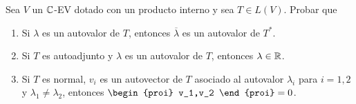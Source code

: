 \item Sea $V$ un $\mathbb{C}$-EV dotado con un producto interno y sea $T\in L(V)$. Probar que
    \begin{enumerate}
        \item Si $\lambda$ es un autovalor de $T$, entonces $\overline{\lambda}$ es un autovalor de $T^*$.
            \begin{mdframed}[style=s]
                
            \end{mdframed}
        \item Si $T$ es autoadjunto y $\lambda$ es un autovalor de $T$, entonces $\lambda\in\mathbb{R}$.
            \begin{mdframed}[style=s]
                
            \end{mdframed}
        \item Si $T$ es normal, $v_i$ es un autovector de $T$ asociado al autovalor $\lambda_i$ para $i=1,2$ y $\lambda_1\neq\lambda_2$, entonces $\begin{proi}
                v_1,v_2
            \end{proi}=0$.
            \begin{mdframed}[style=s]
                
            \end{mdframed}
    \end{enumerate}